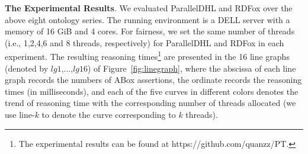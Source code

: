 \begin{table}[htb]
{%
}
\label{tab:expresult}
\end{table}

\textbf{The Experimental Results}.
We evaluated ParallelDHL and RDFox over the above eight ontology series.
The running environment is a DELL server with a
memory of 16 GiB and 4 cores.
For fairness, we set the same number of threads (i.e., 1,2,4,6 and 8 threads, respectively)
for ParallelDHL and RDFox in each experiment. The resulting reasoning
times\footnote{The experimental results can be found at https://github.com/quanzz/PT.} are
presented in the 16 line graphs (denoted by $lg1$,...,$lg16$) of Figure~\ref{fig:linegraph},
where the abscissa of each line graph records the numbers of ABox assertions,
the ordinate records the reasoning times (in milliseconds),
and each of the five curves in different colors denotes the trend of reasoning time with the
corresponding number of threads allocated (we use line-$k$ to denote the curve
corresponding to $k$ threads).


